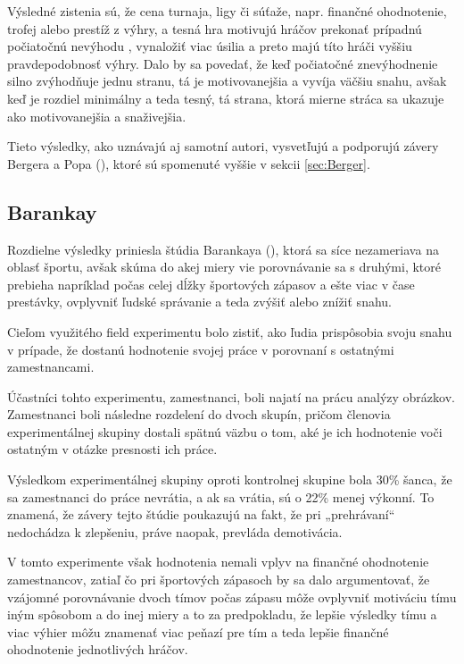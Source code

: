 \documentclass[
  digital, %
  oneside, %
  notable,   %
  lof,     %
  lot,     %
]{fithesis3}
\begin{document}
		Výsledné zistenia sú, že cena turnaja, ligy či súťaže, napr. finančné ohodnotenie, trofej alebo prestíž z výhry, a tesná hra motivujú hráčov prekonať prípadnú počiatočnú nevýhodu , vynaložiť viac úsilia a preto majú títo hráči vyššiu pravdepodobnosť výhry. \parencite[s.~20]{bergerhoff2015} Dalo by sa povedať, že keď počiatočné znevýhodnenie silno zvýhodňuje jednu stranu, tá je motivovanejšia a vyvíja väčšiu snahu, avšak keď je rozdiel minimálny a teda tesný, tá strana, ktorá mierne stráca sa ukazuje ako motivovanejšia a snaživejšia.
		
		Tieto výsledky, ako uznávajú aj samotní autori, vysvetľujú a podporujú závery Bergera a Popa (\citeyear{berger2011}), ktoré sú spomenuté vyššie v sekcii \ref{sec:Berger}.
		
		\subsection{Barankay}
		Rozdielne výsledky priniesla štúdia Barankaya (\citeyear{barankay2010}), ktorá sa síce nezameriava na oblasť športu, avšak skúma do akej miery vie porovnávanie sa s druhými, ktoré prebieha napríklad počas celej dĺžky športových zápasov a ešte viac v čase prestávky, ovplyvniť ľudské správanie a teda zvýšiť alebo znížiť snahu.
		
		Cieľom využitého field experimentu bolo zistiť, ako ľudia prispôsobia svoju snahu v prípade, že dostanú hodnotenie svojej práce v porovnaní s ostatnými zamestnancami. 
		
		Účastníci tohto experimentu, zamestnanci, boli najatí na prácu analýzy obrázkov. Zamestnanci boli následne rozdelení do dvoch skupín, pričom členovia experimentálnej skupiny dostali spätnú väzbu o tom, aké je ich hodnotenie voči ostatným v otázke presnosti ich práce. 
		
		Výsledkom experimentálnej skupiny oproti kontrolnej skupine bola 30\% šanca, že sa zamestnanci do práce nevrátia, a ak sa vrátia, sú o 22\% menej výkonní. To znamená, že závery tejto štúdie poukazujú na fakt, že pri „prehrávaní“ nedochádza k zlepšeniu, práve naopak, prevláda demotivácia. \parencite[s.~4]{barankay2010}
		
		V tomto experimente však hodnotenia nemali vplyv na finančné ohodnotenie zamestnancov, zatiaľ čo pri športových zápasoch by sa dalo argumentovať, že vzájomné porovnávanie dvoch tímov počas zápasu môže ovplyvniť motiváciu tímu iným spôsobom a do inej miery a to za predpokladu, že lepšie výsledky tímu a viac výhier môžu znamenať viac peňazí pre tím a teda lepšie finančné ohodnotenie jednotlivých hráčov.
		
\end{document}
